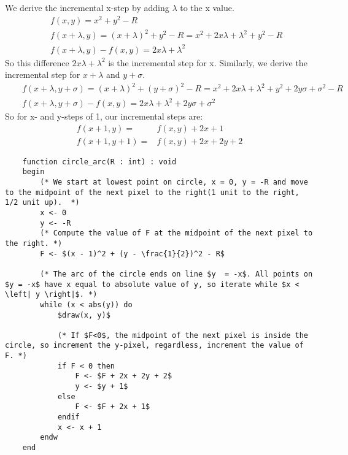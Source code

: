 \documentclass[a4paper, 12pt]{article}
\begin{document}
We derive the incremental x-step by adding $\lambda$ to the x value.
\begin{eqnarray*}
    && f(x, y) = x^2 + y^2 -R \\
    && f(x + \lambda, y) = (x + \lambda)^2 + y^2 -R = x^2 + 2x \lambda + \lambda^2 + y^2 -R \\
    && f(x + \lambda, y) - f(x, y) = 2x\lambda + \lambda^2
\end{eqnarray*}
So this difference $2x\lambda + \lambda^2$ is the incremental step for x. Similarly, we derive the incremental step for $x + \lambda$ and $y + \sigma$.
\begin{eqnarray*}
    && f(x + \lambda, y + \sigma) = (x + \lambda)^2 + (y + \sigma)^2 - R = x^2 + 2x\lambda + \lambda^2 + y^2 + 2y\sigma + \sigma^2 - R \\
    && f(x + \lambda, y + \sigma) - f(x, y) = 2x\lambda + \lambda^2 + 2y\sigma + \sigma^2
\end{eqnarray*}
So for x- and y-steps of 1, our incremental steps are:
\begin{eqnarray*}
    f(x+1, y) =& f(x, y) + 2x + 1 \\
    f(x+1, y+1) =& f(x, y) + 2x + 2y + 2
\end{eqnarray*}
\begin{lstlisting}
    function circle_arc(R : int) : void
    begin
        (* We start at lowest point on circle, x = 0, y = -R and move to the midpoint of the next pixel to the right(1 unit to the right, 1/2 unit up).  *)
        x <- 0
        y <- -R
        (* Compute the value of F at the midpoint of the next pixel to the right. *)
        F <- $(x - 1)^2 + (y - \frac{1}{2})^2 - R$

        (* The arc of the circle ends on line $y  = -x$. All points on $y = -x$ have x equal to absolute value of y, so iterate while $x < \left| y \right|$. *)
        while (x < abs(y)) do
            $draw(x, y)$

            (* If $F<0$, the midpoint of the next pixel is inside the circle, so increment the y-pixel, regardless, increment the value of F. *)
            if F < 0 then
                F <- $F + 2x + 2y + 2$
                y <- $y + 1$
            else
                F <- $F + 2x + 1$
            endif
            x <- x + 1
        endw
    end
        
\end{lstlisting}
\end{document}
